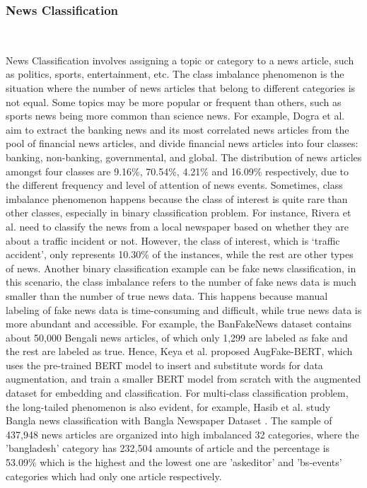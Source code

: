 \subsubsection{News Classification}\ 

News Classification involves assigning a topic or category to a news article, such as politics, sports, entertainment, etc. The class imbalance phenomenon is the situation where the number of news articles that belong to different categories is not equal. 
Some topics may be more popular or frequent than others, such as sports news being more common than science news. For example, Dogra et al. \cite{dogra2022comparative} aim to extract the banking news and its most correlated news articles from the pool of financial news articles, and divide financial news articles into four classes: banking, non-banking, governmental, and global. The distribution of news articles amongst four classes are 9.16\%, 70.54\%, 4.21\% and 16.09\% respectively, due to the different frequency and level of attention of news events. 
Sometimes, class imbalance phenomenon happens because the class of interest is quite rare than other classes, especially in binary classification problem. For instance, Rivera et al. \cite{rivera2020news} need to classify the news from a local newspaper based on whether they are about a traffic incident or not. However, the class of interest, which is ‘traffic accident’, only represents 10.30\% of the instances, while the rest are other types of news. 
Another binary classification example can be fake news classification, in this scenario, the class imbalance refers to the number of fake news data is much smaller than the number of true news data. This happens because manual labeling of fake news data is time-consuming and difficult, while true news data is more abundant and accessible. For example, the BanFakeNews dataset \cite{hossain2020banfakenews} contains about 50,000 Bengali news articles, of which only 1,299 are labeled as fake and the rest are labeled as true. Hence, Keya et al. \cite{keya2022augfake} proposed AugFake-BERT, which uses the pre-trained BERT model to insert and substitute words for data augmentation, and train a smaller BERT model from scratch with the augmented dataset for embedding and classification. For multi-class classification problem, the long-tailed phenomenon is also evident, for example, Hasib et al. \cite{hasib2023strategies} study Bangla news classification with Bangla Newspaper Dataset \cite{zabir_al_nazi_2020}. The sample of 437,948 news articles are organized into high imbalanced 32 categories, where the 'bangladesh' category has 232,504 amounts of article and the percentage is 53.09\% which is the highest and the lowest one are 'askeditor' and 'bs-events' categories which had only one article respectively.


